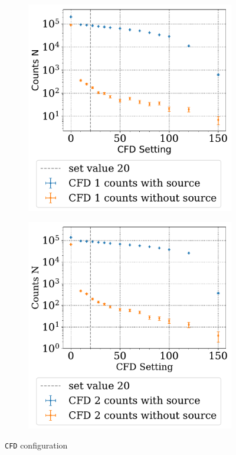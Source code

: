 \documentclass[11pt,a4paper,notitlepage]{scrartcl}
\begin{document}
\begin{figure}[H]
	\centering
	\begin{subfigure}{0.3\linewidth}
		\includegraphics[width=\linewidth]{figs/CFD/CFD1.pdf}
	\end{subfigure}
		\begin{subfigure}{0.3\linewidth}
		\includegraphics[width=\linewidth]{figs/CFD/CFD2.pdf}
	\end{subfigure}
	\caption{\texttt{CFD} configuration}\label{fig:CFD_adjust}
\end{figure}
\end{document}
